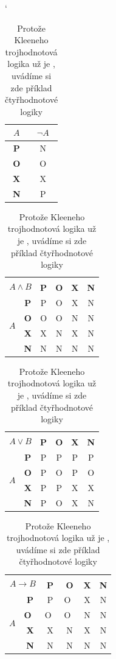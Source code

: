 \documentclass[11pt,a4paper]{article}
\begin{document}
\begin{table}[h] 
\begin{center}
\catcode`
\begin{tabular}{|c|c|}
\hline
$A$ & $\neg A$ \\ \hline
\textbf{P} & N \\ \hline
\textbf{O} & O \\ \hline
\textbf{X} & X \\ \hline
\textbf{N} & P \\ \hline
\end{tabular}
\begin{tabular}{|c|>{\bfseries}c|c|c|c|c|}
\hline 
    \multicolumn{2}{|c|}{\multirow{2}{*}{$A \land B$}}&\multicolumn{4}{c|}{$B$}\\\cline{3-6}
 \multicolumn{2}{|c|}{} & \textbf{P} & \textbf{O} & \textbf{X} & \textbf{N} \\ 
    \hline 
\multirow{4}{*}{$A$}
    & P & P & O & X & N  \\ \cline{2-6} 
    & O & O & O & N & N  \\ \cline{2-6}
    & X & X & N & X & N  \\ \cline{2-6}
    & N & N & N & N & N  \\ \cline{2-6}
  \cline{1-1}
\end{tabular}
\begin{tabular}{|c|>{\bfseries}c|c|c|c|c|}
\hline 
    \multicolumn{2}{|c|}{\multirow{2}{*}{$A \lor B$}}&\multicolumn{4}{c|}{$B$}\\\cline{3-6}
 \multicolumn{2}{|c|}{} & \textbf{P} & \textbf{O} & \textbf{X} & \textbf{N} \\ 
    \hline 
\multirow{4}{*}{$A$}
    & P & P & P & P & P  \\ \cline{2-6} 
    & O & P & O & P & O  \\ \cline{2-6}
    & X & P & P & X & X  \\ \cline{2-6}
    & N & P & O & X & N  \\ \cline{2-6}
    \cline{1-1}
\end{tabular}
\begin{tabular}{|c|>{\bfseries}c|c|c|c|c|}
\hline 
    \multicolumn{2}{|c|}{\multirow{2}{*}{$A \rightarrow B$}}&\multicolumn{4}{c|}{$B$}\\\cline{3-6}
 \multicolumn{2}{|c|}{} & \textbf{P} & \textbf{O} & \textbf{X} & \textbf{N} \\ 
    \hline 
\multirow{4}{*}{$A$}
    & P & P & O~& X & N  \\ \cline{2-6} 
    & O~& O~& O~& N & N  \\ \cline{2-6}
    & X & X & N & X & N  \\ \cline{2-6}
    & N & N & N & N & N  \\ \cline{2-6}
    \cline{1-1}
\end{tabular}
\caption{\label{tab:tab2}Protože Kleeneho trojhodnotová logika už je , uvádíme si zde příklad čtyřhodnotové logiky}
\end{center}
\end{table}
\pagebreak
\end{document}
